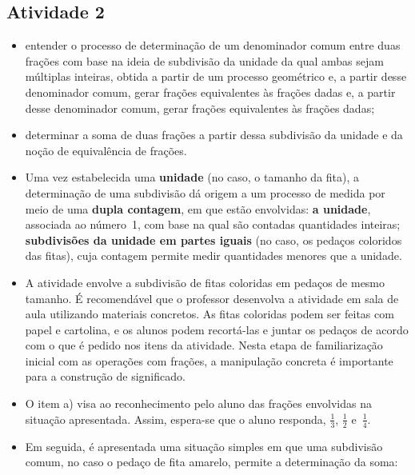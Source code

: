 \begin{multicols}{2}
\subsection{Atividade 2}

  \newline \vspace{.15cm}

\begin{itemize} %
    \item       entender o processo de determinação de um denominador comum entre duas frações com base na ideia de subdivisão da unidade da qual ambas sejam múltiplas inteiras, obtida a partir de um processo geométrico e, a partir desse denominador comum, gerar frações equivalentes às frações dadas e, a partir desse denominador comum, gerar frações equivalentes às frações dadas;
    \item       determinar a soma de duas frações a partir dessa subdivisão da unidade e da noção de equivalência de frações.
\end{itemize} %

\vspace*{\fill}
\columnbreak

   \vspace{.15cm}

\begin{itemize} %
    \item       Uma vez estabelecida uma       {\bf unidade}       (no caso, o tamanho da fita), a determinação de uma subdivisão dá origem a um processo de medida por meio de uma       {\bf dupla contagem}, em que estão envolvidas:       {\bf a unidade}, associada ao número~1, com base na qual são contadas quantidades inteiras;       {\bf subdivisões da unidade em partes iguais}       (no caso, os pedaços coloridos das fitas), cuja contagem permite medir quantidades menores que a unidade.
    \item       A atividade envolve a subdivisão de fitas coloridas em pedaços de mesmo tamanho. É recomendável que o professor desenvolva a atividade em sala de aula utilizando materiais concretos. As fitas coloridas podem ser feitas com papel e cartolina, e os alunos podem recortá-las e juntar os pedaços de acordo com o que é pedido nos itens da atividade. Nesta etapa de familiarização inicial com as operações com frações, a manipulação concreta é importante para a construção de significado.
    \item       O item a) visa ao reconhecimento pelo aluno das frações envolvidas na situação apresentada. Assim, espera-se que o aluno responda,       $\frac{1}{3}$,       $\frac{1}{2}$       e~$\frac{1}{4}$.
    \item       Em seguida, é apresentada uma situação simples em que uma subdivisão comum, no caso o pedaço de fita amarelo, permite a determinação da soma:
\end{itemize} %


\end{multicols}
